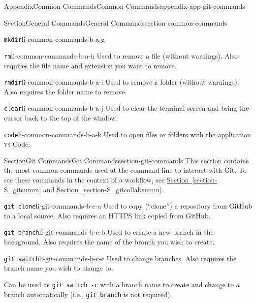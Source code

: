 \documentclass[oneside,10pt,]{book}
\newcommand{\xreffont}{\relax}
\newcommand{\mono}[1]{\texttt{#1}}
\newcommand{\initialism}[1]{\textsc{\MakeLowercase{#1}}}
\begin{document}
\begin{appendixptx}{Appendix}{Common Commands}{}{Common Commands}{}{}{appendix-app-git-commands}
\begin{sectionptx}{Section}{General Commands}{}{General Commands}{}{}{section-common-commands}
\begin{descriptionlist}
\begin{dlimedium}{\mono{mkdir}}{li-common-commands-b-a-g}
\end{dlimedium}%
\begin{dlimedium}{\mono{rm}}{li-common-commands-b-a-h}%
Used to remove a file (without warnings). Also requires the file name and extension you want to remove.%
\end{dlimedium}%
\begin{dlimedium}{\mono{rmdir}}{li-common-commands-b-a-i}%
Used to remove a folder (without warnings). Also requires the folder name to remove.%
\end{dlimedium}%
\begin{dlimedium}{\mono{clear}}{li-common-commands-b-a-j}%
Used to clear the terminal screen and bring the cursor back to the top of the window.%
\end{dlimedium}%
\begin{dlimedium}{\mono{code}}{li-common-commands-b-a-k}%
Used to open files or folders with the application \initialism{VS} Code.%
\end{dlimedium}%
\end{descriptionlist}
%
\end{sectionptx}
%
%
\typeout{************************************************}
\typeout{************************************************}
%
\begin{sectionptx}{Section}{Git Commands}{}{Git Commands}{}{}{section-git-commands}
This section contains the most common commands used at the command line to interact with Git. To see these commands in the context of a workflow, see \hyperref[section-S_gitsumm]{Section~{\xreffont\ref{section-S_gitsumm}}} and \hyperref[section-S_gitcollabsumm]{Section~{\xreffont\ref{section-S_gitcollabsumm}}}.%
\begin{descriptionlist}
\begin{dlimedium}{\mono{git clone}}{li-git-commands-b-c-a}%
Used to copy (``clone'') a repository from GitHub to a local source. Also requires an HTTPS link copied from GitHub.%
\end{dlimedium}%
\begin{dlimedium}{\mono{git branch}}{li-git-commands-b-c-b}%
Used to create a new branch in the background. Also requires the name of the branch you wish to create.%
\end{dlimedium}%
\begin{dlimedium}{\mono{git switch}}{li-git-commands-b-c-c}%
Used to change branches. Also requires the branch name you wish to change to.%
\par
Can be used as \mono{git switch -c} with a branch name to create and change to a branch automatically (i.e.\@, \mono{git branch} is not required).%

\end{dlimedium}
\end{descriptionlist}
\end{sectionptx}
\end{appendixptx}
\end{document}
